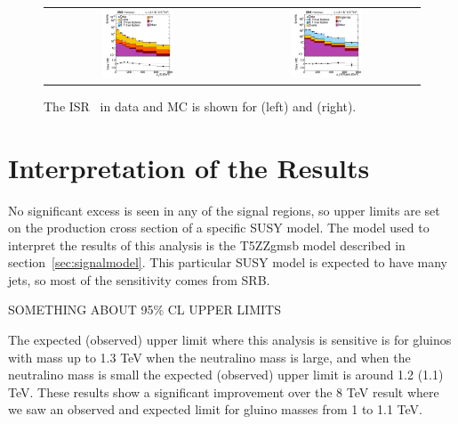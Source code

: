 \begin{figure}[!ht]
\begin{center}
\begin{tabular}{cc}
\includegraphics[width=0.4\textwidth]{results/figs/CMS-PAS-SUS-15-007_Figure_010-a.pdf} &
\includegraphics[width=0.4\textwidth]{results/figs/CMS-PAS-SUS-15-007_Figure_010-b.pdf} \\
\end{tabular}
\caption{
\label{fig:isrmodeling}
The ISR \pt\ in data and MC is shown for \zjets(left) and \ttbar(right).
}
\end{center}
\end{figure}

\clearpage

\section{Interpretation of the Results}
No significant excess is seen in any of the signal regions, so upper limits are set on the production cross section of a specific SUSY model.
The model used to interpret the results of this analysis is the T5ZZgmsb model described in section~\ref{sec:signalmodel}.
This particular SUSY model is expected to have many jets, so most of the sensitivity comes from SRB.

SOMETHING ABOUT 95\% CL UPPER LIMITS

The expected (observed) upper limit where this analysis is sensitive is for gluinos with mass up to 1.3 TeV when the neutralino mass is large,
and when the neutralino mass is small the expected (observed) upper limit is around 1.2 (1.1) TeV.
These results show a significant improvement over the 8 TeV result where we saw an observed and expected limit for gluino masses from 1 to 1.1 TeV.


